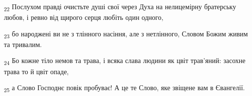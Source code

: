 \begin{tcolorbox}
\textsubscript{22} Послухом правді очистьте душі свої через Духа на нелицемірну братерську любов, і ревно від щирого серця любіть один одного,
\end{tcolorbox}
\begin{tcolorbox}
\textsubscript{23} бо народжені ви не з тлінного насіння, але з нетлінного, Словом Божим живим та тривалим.
\end{tcolorbox}
\begin{tcolorbox}
\textsubscript{24} Бо кожне тіло немов та трава, і всяка слава людини як цвіт трав'яний: засохне трава то й цвіт опаде,
\end{tcolorbox}
\begin{tcolorbox}
\textsubscript{25} а Слово Господнє повік пробуває! А це те Слово, яке звіщене вам в Євангелії.
\end{tcolorbox}

